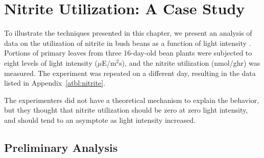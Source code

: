 \section{Nitrite Utilization:  A Case Study}

To illustrate the techniques presented in this chapter, we present an
analysis of data on the utilization of nitrite in bush beans as
a function of light intensity \cite{elli:peir:1986}.
Portions of primary leaves from three
16-day-old bean plants were subjected to eight levels of light
intensity ($\mu$E/m$^{2}$s), and the nitrite utilization
(nmol/ghr) was measured.
The experiment was repeated on a different day, resulting in the
data listed in Appendix~\ref{atbl:nitrite}.

The experimenters did not have a theoretical mechanism to explain
the behavior, but they thought that nitrite utilization should be
zero at zero light intensity, and should tend to an asymptote as
light intensity increased.
\subsection{Preliminary Analysis}

